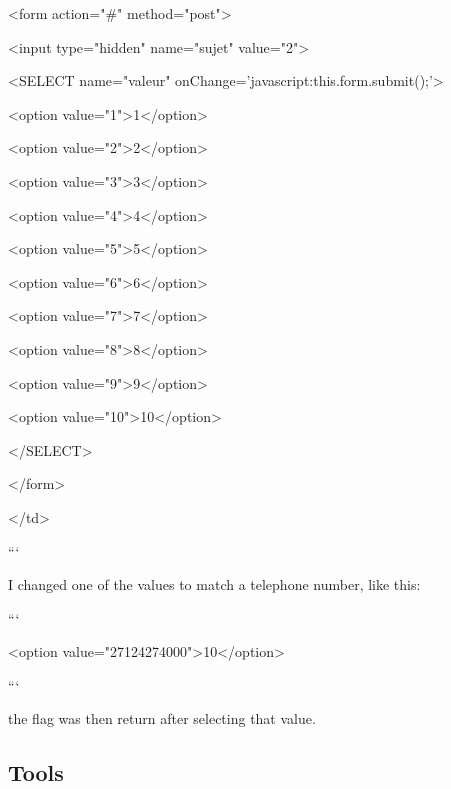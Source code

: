         <form action="\#" method="post">
    
        <input type="hidden" name="sujet" value="2">
    
        <SELECT name="valeur" onChange='javascript:this.form.submit();'>
    
            <option value="1">1</option>
      
            <option value="2">2</option>
      
            <option value="3">3</option>
      
            <option value="4">4</option>
      
            <option value="5">5</option>
      
            <option value="6">6</option>
      
            <option value="7">7</option>
      
            <option value="8">8</option>
      
            <option value="9">9</option>
      
            <option value="10">10</option>
        
        </SELECT>
  
    </form>

</td>

```

I changed one of the values to match a telephone number, like this:

```

<option value="27124274000">10</option>

```

the flag was then return after selecting that value.


\subsection{Tools}

